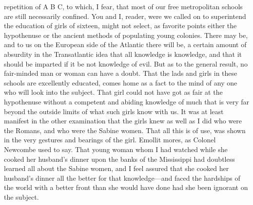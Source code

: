 repetition of A B C, to which, I fear, that most of our free
metropolitan schools are still necessarily confined.  You and I,
reader, were we called on to superintend the education of girls of
sixteen, might not select, as favorite points either the
hypothenuse or the ancient methods of populating young colonies.
There may be, and to us on the European side of the Atlantic there
will be, a certain amount of absurdity in the Transatlantic idea
that all knowledge is knowledge, and that it should be imparted if
it be not knowledge of evil.  But as to the general result, no
fair-minded man or woman can have a doubt.  That the lads and girls
in these schools are excellently educated, comes home as a fact to
the mind of any one who will look into the subject.  That girl
could not have got as fair at the hypothenuse without a competent
and abiding knowledge of much that is very far beyond the outside
limits of what such girls know with us.  It was at least manifest
in the other examination that the girls knew as well as I did who
were the Romans, and who were the Sabine women.  That all this is
of use, was shown in the very gestures and bearings of the girl.
Emollit mores, as Colonel Newcombe used to say.  That young woman
whom I had watched while she cooked her husband's dinner upon the
banks of the Mississippi had doubtless learned all about the Sabine
women, and I feel assured that she cooked her husband's dinner all
the better for that knowledge---and faced the hardships of the world
with a better front than she would have done had she been ignorant
on the subject.

